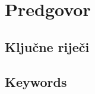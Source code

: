 \chapter*{Predgovor}



\strut\vfill


\begin{longsik}
 \section*{Ključne riječi}
 


 \section*{Keywords}
  
\end{longsik}


\cleardoublepage